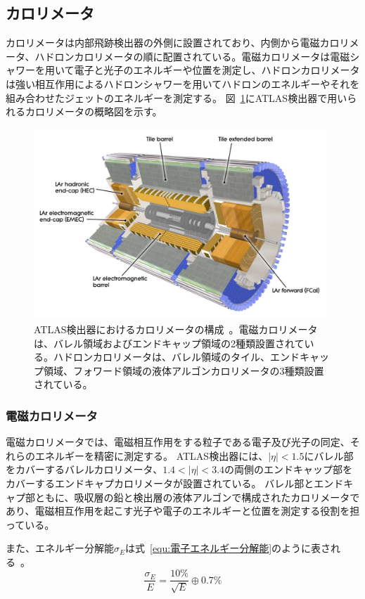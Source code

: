 \subsection{カロリメータ}
カロリメータは内部飛跡検出器の外側に設置されており、内側から電磁カロリメータ、ハドロンカロリメータの順に配置されている。電磁カロリメータは電磁シャワーを用いて電子と光子のエネルギーや位置を測定し、ハドロンカロリメータは強い相互作用によるハドロンシャワーを用いてハドロンのエネルギーやそれを組み合わせたジェットのエネルギーを測定する。
図~\ref{fig:カロリメータ}にATLAS検出器で用いられるカロリメータの概略図を示す。

\begin{figure}[tb]
  \centering
  \includegraphics[clip, width=11cm]{fig/2/Calorimeter_d3.pdf}
  \caption{ATLAS検出器におけるカロリメータの構成~\cite{Aad:1129811}。電磁カロリメータは、バレル領域およびエンドキャップ領域の2種類設置されている。ハドロンカロリメータは、バレル領域のタイル、エンドキャップ領域、フォワード領域の液体アルゴンカロリメータの3種類設置されている。}
  \label{fig:カロリメータ}
\end{figure}

\subsubsection{電磁カロリメータ}
電磁カロリメータでは、電磁相互作用をする粒子である電子及び光子の同定、それらのエネルギーを精密に測定する。
ATLAS検出器には、$|\eta|<1.5$にバレル部をカバーするバレルカロリメータ、$1.4<|\eta|<3.4$の両側のエンドキャップ部をカバーするエンドキャプカロリメータが設置されている。
バレル部とエンドキャプ部ともに、吸収層の鉛と検出層の液体アルゴンで構成されたカロリメータであり、電磁相互作用を起こす光子や電子のエネルギーと位置を測定する役割を担っている。

また、エネルギー分解能$\sigma_{E}$は式~\eqref{equ:電子エネルギー分解能}のように表される~\cite{Aad:1129811}。
\begin{equation}
    \frac{\sigma_{E}}{E} = \frac{10 \%}{\sqrt{E}}\oplus 0.7 \%
　\label{equ:電子エネルギー分解能}
\end{equation}



